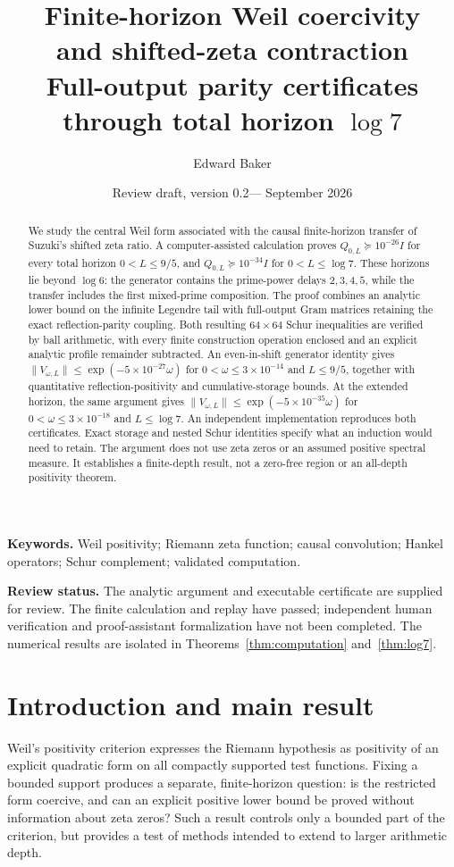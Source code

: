 \documentclass[11pt]{article}
\title{Finite-horizon Weil coercivity\protect\\ and shifted-zeta contraction\protect\\[5pt]
\large Full-output parity certificates through total horizon $\log 7$}
\author{Edward Baker}
\date{Review draft, version 0.2\quad---\quad 9 September 2026}
\numberwithin{equation}{section}
\theoremstyle{definition}
\theoremstyle{remark}
\newcommand{\norm}[1]{\lVert#1\rVert}
\begin{document}
\maketitle
\begin{abstract}
We study the central Weil form associated with the causal finite-horizon
transfer of Suzuki's shifted zeta ratio. A computer-assisted calculation proves
$Q_{0,L}\succeq10^{-26}I$ for every total horizon $0<L\le9/5$, and
$Q_{0,L}\succeq10^{-34}I$ for $0<L\le\log7$.
These horizons lie beyond $\log6$: the generator contains the prime-power
delays $2,3,4,5$, while the transfer includes the first mixed-prime composition.
The proof combines an analytic lower bound on the infinite Legendre tail with
full-output Gram matrices retaining the exact reflection-parity coupling.
Both resulting $64\times64$ Schur inequalities are verified by ball arithmetic,
with every finite construction operation enclosed and an explicit analytic
profile remainder subtracted. An even-in-shift generator identity gives
$\norm{V_{\omega,L}}\le\exp(-5\times10^{-27}\omega)$ for
$0<\omega\le3\times10^{-14}$ and $L\le9/5$, together with quantitative
reflection-positivity and cumulative-storage bounds. At the extended horizon,
the same argument gives $\norm{V_{\omega,L}}\le\exp(-5\times10^{-35}\omega)$
for $0<\omega\le3\times10^{-18}$ and $L\le\log7$.
An independent implementation reproduces both certificates. Exact storage
and nested Schur identities specify what an induction would need to retain.
The argument does not use zeta zeros or an assumed positive spectral measure. It establishes a
finite-depth result, not a zero-free region or an all-depth positivity theorem.
\end{abstract}

\noindent\textbf{Keywords.} Weil positivity; Riemann zeta function; causal
convolution; Hankel operators; Schur complement; validated computation.

\smallskip
\noindent\textbf{Review status.} The analytic argument and executable
certificate are supplied for review. The finite calculation and replay have
passed; independent human verification and proof-assistant formalization have
not been completed. The numerical results are isolated in
Theorems~\ref{thm:computation} and~\ref{thm:log7}.

\section{Introduction and main result}

Weil's positivity criterion expresses the Riemann hypothesis as positivity of
an explicit quadratic form on all compactly supported test functions. Fixing
a bounded support produces a separate, finite-horizon question: is the
restricted form coercive, and can an explicit positive lower bound be proved
without information about zeta zeros? Such a result controls only a bounded
part of the criterion, but provides a test of methods intended to extend to
larger arithmetic depth.
\end{document}
